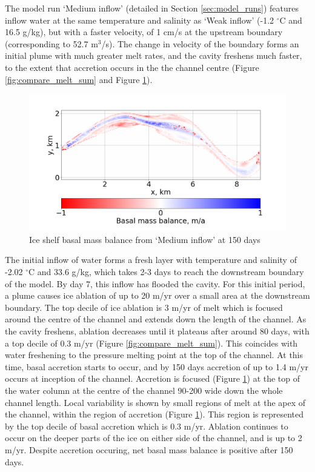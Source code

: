 The model run `Medium inflow' (detailed in Section \ref{sec:model_runs}) features inflow water at the same temperature and salinity as `Weak inflow' (-1.2 $^{\circ}$C and 16.5 g/kg), but with a faster velocity, of 1 cm/s at the upstream boundary (corresponding to 52.7 $\mathrm{m}^3$/s). The change in velocity of the boundary forms an initial plume with much greater melt rates, and the cavity freshens much faster, to the extent that accretion occurs in the the channel centre (Figure \ref{fig:compare_melt_sum} and Figure \ref{fig:accretion}).

\begin{figure}[!ht]
\centering
\includegraphics[width=1\textwidth]{chapters/4/accretion.png}
\caption[Medium inflow (melt)]{Ice shelf basal mass balance from `Medium inflow' at 150 days}
\label{fig:accretion}
\end{figure}

The initial inflow of water forms a fresh layer with temperature and salinity of -2.02 $^{\circ}$C and 33.6  g/kg, which takes 2-3 days to reach the downstream boundary of the model. By day 7, this inflow has flooded the cavity.  
For this initial period, a plume causes ice ablation of up to 20 m/yr over a small area at the downstream boundary. The top decile of ice ablation is 3 m/yr of melt which is focused around the centre of the channel and extends down the length of the channel. As the cavity freshens, ablation decreases until it plateaus after around 80 days, with a top decile of 0.3 m/yr (Figure \ref{fig:compare_melt_sum}). This coincides with water freshening to the pressure melting point at the top of the channel. At this time, basal accretion starts to occur, and by 150 days accretion of up to 1.4 m/yr occurs at inception of the channel. Accretion is focused (Figure \ref{fig:accretion}) at the top of the water column at the centre of the channel 90-200 wide down the whole channel length. Local variability is shown by small regions of melt at the apex of the channel, within the region of accretion (Figure \ref{fig:accretion}). This region is represented by the top decile of basal accretion which is 0.3 m/yr. Ablation continues to occur on the deeper parts of the ice on either side of the channel, and is up to 2 m/yr. Despite accretion occuring, net basal mass balance is positive after 150 days.



